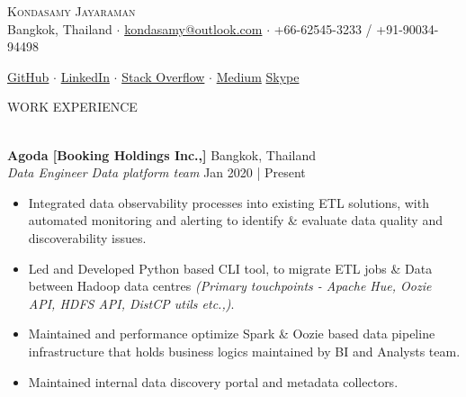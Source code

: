 \documentclass[a4paper]{article}
\newcommand{\lineunder} {
    \vspace*{-8pt} \\
    \hspace*{-18pt} \hrulefill \\
}
\newcommand{\header} [1] {
    {\hspace*{-18pt}\vspace*{6pt} \textsc{#1}}
    \vspace*{-6pt} \lineunder
}
\begin{document}
\vspace*{-50pt}

    

\vspace*{-12pt}
\begin{center}
	{\Huge \scshape {Kondasamy Jayaraman}}\\
	\vspace{1mm}
	\faMapMarker \hspace{.5mm} Bangkok, Thailand $\cdot$ 
	\faEnvelope \hspace{.5mm} \href{mailto:kondasamy@outlook.com}{kondasamy@outlook.com} $\cdot$ \faMobile \hspace{.5mm} +66-62545-3233 / \faWhatsapp  \hspace{.5mm} +91-90034-94498
		
	\faGithub \hspace{.5mm} \href{https://github.com/Kondasamy}{GitHub} $\cdot$
	\faLinkedin \hspace{.5mm} \href{https://www.linkedin.com/in/kondasamy/}{LinkedIn} $\cdot$
	\faStackOverflow \hspace{.5mm} \href{https://stackoverflow.com/users/2094099/kondasamy-jayaraman}{Stack Overflow} $\cdot$
	\faMedium \hspace{.5mm} \href{https://medium.com/@kondasamy}{Medium}
	\faSkype \hspace{.5mm} \href{https://join.skype.com/invite/n0IMYwGkGwQ1}{Skype}\\
\end{center}

\header{WORK EXPERIENCE}
\vspace{1mm}

\textbf{Agoda [Booking Holdings Inc.,]} \hfill Bangkok, Thailand\\
\textit{Data Engineer \textbar{} Data platform team} \hfill Jan 2020 | Present\\
\vspace{-1.5mm}
\begin{itemize} \setlength\itemsep{-0.3em}
    \item Integrated data observability processes into existing ETL solutions, with automated monitoring and alerting to identify \& evaluate data quality and discoverability issues.
    \item Led and Developed Python based CLI tool, to migrate ETL jobs \& Data between Hadoop data centres \textit{(Primary touchpoints - Apache Hue, Oozie API, HDFS API, DistCP utils etc.,)}.
    \item Maintained and performance optimize Spark \& Oozie based data pipeline infrastructure that holds business logics maintained by BI and Analysts team.
    \item Maintained internal data discovery portal and metadata collectors.
\end{itemize}
\end{document}
